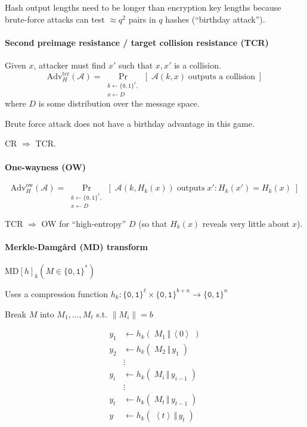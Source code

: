 \documentclass[11pt]{article}
\newcommand{\bit}{\ensuremath{\{\texttt{0},\texttt{1}\}}}
\newcommand{\ang}[1]{\ensuremath{\left\langle#1\right\rangle}}
\theoremstyle{remark}
\begin{document}
Hash output lengths need to be longer than encryption key lengths
because brute-force attacks can test $\approx q^2$ pairs in $q$ hashes
(``birthday attack'').

\paragraph{Second preimage resistance / target collision resistance (TCR)}
Given $x$, attacker must find $x'$ such that $x,x'$ is a collision.
\[ \text{Adv}_H^\text{tcr}(\mathcal{A}) =
\Pr_{\substack{k\leftarrow\bit^\ell,\\x\leftarrow D}}
\left[\;\mathcal{A}(k, x)\;\text{outputs a collision}\;\right] \]
where $D$ is some distribution over the message space.

Brute force attack does not have a birthday advantage in this game.

CR $\Rightarrow$ TCR.

\paragraph{One-wayness (OW)}

\[ \text{Adv}_H^\text{ow}(\mathcal{A}) =
\Pr_{\substack{k\leftarrow\bit^\ell,\\x\leftarrow D}}
\left[\;\mathcal{A}(k, H_k(x))\;\text{outputs}\;x':H_k(x')=H_k(x)\;\right] \]

TCR $\Rightarrow$ OW for ``high-entropy'' $D$
(so that $H_k(x)$ reveals very little about $x$).

\paragraph{Merkle-Damg{\aa}rd (MD) transform}
$\text{MD}[h]_k(M\in\bit^*)$

Uses a compression function $h_k:\bit^\ell\times\bit^{b+n}\rightarrow\bit^n$

Break $M$ into $M_1,\ldots,M_t$ s.t. $\|M_i\|=b$

\begin{align*}
y_1 &\leftarrow h_k(\;M_1\,\Vert\,\ang{0}\;) \\
y_2 &\leftarrow h_k(\;M_2\,\Vert\,y_1\;) \\
&\vdots\\
y_i &\leftarrow h_k(\;M_i\,\Vert\,y_{i-1}\;) \\
&\vdots\\
y_t &\leftarrow h_k(\;M_t\,\Vert\,y_{t-1}\;) \\
y &\leftarrow h_k(\;\ang{t}\,\Vert\,y_t\;)
\end{align*}
\end{document}
